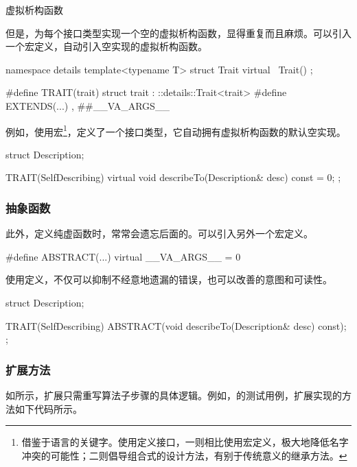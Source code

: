 \begin{content}
\begin{episode}{虚拟析构函数}
\begin{content}
但是，为每个接口类型实现一个空的虚拟析构函数，显得重复而且麻烦。可以引入一个宏定义，自动引入空实现的虚拟析构函数。

 \begin{c++}
namespace details {
  template<typename T>
  struct Trait {
    virtual ~Trait() {}
  };
}

#define TRAIT(trait)  struct trait : ::details::Trait<trait>
#define EXTENDS(...) , ##__VA_ARGS__
 \end{c++}

例如，使用宏\footnote{借鉴于语言的关键字。使用定义接口，一则相比使用宏定义，极大地降低名字冲突的可能性；二则倡导组合式的设计方法，有别于传统意义的继承方法。}，定义了一个接口类型，它自动拥有虚拟析构函数的默认空实现。

 \begin{c++}
struct Description;

TRAIT(SelfDescribing) {
  virtual void describeTo(Description& desc) const = 0;
};
 \end{c++}

\subsubsection{抽象函数}

此外，定义纯虚函数时，常常会遗忘后面的。可以引入另外一个宏定义。

 \begin{c++}
#define ABSTRACT(...) virtual __VA_ARGS__ = 0
 \end{c++}

使用定义，不仅可以抑制不经意地遗漏的错误，也可以改善的意图和可读性。

\begin{c++}
struct Description;

TRAIT(SelfDescribing) {
  ABSTRACT(void describeTo(Description& desc) const);
};
\end{c++}

\end{content}
\end{episode}

\subsubsection{扩展方法}

如所示，扩展只需重写算法子步骤的具体逻辑。例如，的测试用例，扩展实现的方法如下代码所示。


\end{content}
